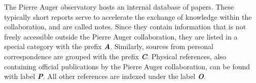 
\let\chapter=\prepostchapter
\pagestyle{plain}

\printbibheading

The Pierre Auger observatory hosts an internal database of papers. These 
typically short reports serve to accelerate the exchange of knowledge within the
collaboration, and are called \GAP notes. Since they contain information that is
not freely accessible outside the Pierre Auger collaboration, they are listed in
a special category with the prefix \textbf{\textit{A}}. Similarly, sources from 
personal correspondence are grouped with the prefix \textbf{\textit{C}}. 
Physical references, also containing official publications by the Pierre Auger 
collaboration, can be found with label \textbf{\textit{P}}. All other references
are indexed under the label \textbf{\textit{O}}.

\newrefcontext[labelprefix=C]
\printbibliography[keyword={private},title={Personal Correspondence},heading=subbibliography]

\newrefcontext[labelprefix=A]
\printbibliography[keyword={GAP-Note},title={GAP Notes},heading=subbibliography]

\newrefcontext[labelprefix=P]
\printbibliography[keyword={phys},notkeyword={GAP-Note},title={Physics References},heading=subbibliography]

\newrefcontext[labelprefix=O]
\printbibliography[notkeyword={private},notkeyword={phys},notkeyword={GAP-Note},title={Other References},heading=subbibliography]

\cleardoublepage
